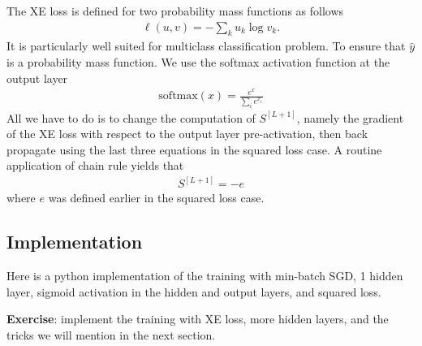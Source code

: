 \documentclass[
  letterpaper,
  DIV=11,
  numbers=noendperiod]{scrartcl}
\begin{document}
The XE loss is defined for two probability mass functions as follows
\begin{align*}
    \ell(u,v) = -\sum_k u_k\log v_k.
\end{align*} It is particularly well suited for multiclass
classification problem. To ensure that \(\hat y\) is a probability mass
function. We use the softmax activation function at the output layer
\begin{align*}
    \mathrm{softmax}(x) =  \frac{e^{x}}{\sum_i e^{x_i}}
\end{align*} All we have to do is to change the computation of
\(S^{[L+1]}\), namely the gradient of the XE loss with respect to the
output layer pre-activation, then back propagate using the last three
equations in the squared loss case. A routine application of chain rule
yields that \begin{align*}
    S^{[L+1]} = - e
\end{align*} where \(e\) was defined earlier in the squared loss case.

\hypertarget{implementation}{%
\subsection{Implementation}\label{implementation}}

Here is a python implementation of the training with min-batch SGD, 1
hidden layer, sigmoid activation in the hidden and output layers, and
squared loss.

\textbf{Exercise}: implement the training with XE loss, more hidden
layers, and the tricks we will mention in the next section.
\end{document}
